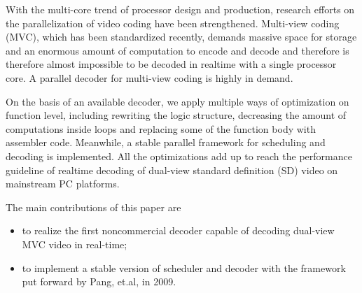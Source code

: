 \begin{eabstract} 

With the multi-core trend of processor design and production, research efforts on the parallelization of video coding have been strengthened. Multi-view coding (MVC), which has been standardized recently, demands massive space for storage and an enormous amount of computation to encode and decode and therefore is therefore almost impossible to be decoded in realtime with a single processor core. A parallel decoder for multi-view coding is highly in demand.

On the basis of an available decoder, we apply multiple ways of optimization on function level, including rewriting the logic structure, decreasing the amount of computations inside loops and replacing some of the function body with assembler code. Meanwhile, a stable parallel framework for scheduling and decoding is implemented. All the optimizations add up to reach the performance guideline of realtime decoding of dual-view standard definition (SD) video on mainstream PC platforms.

The main contributions of this paper are
\begin{itemize}
\item to realize the first noncommercial decoder capable of decoding dual-view MVC video in real-time;
\item to implement a stable version of scheduler and decoder with the framework\cite{pang2009framework} put forward by Pang, et.al, in 2009.
\end{itemize}

\end{eabstract}


